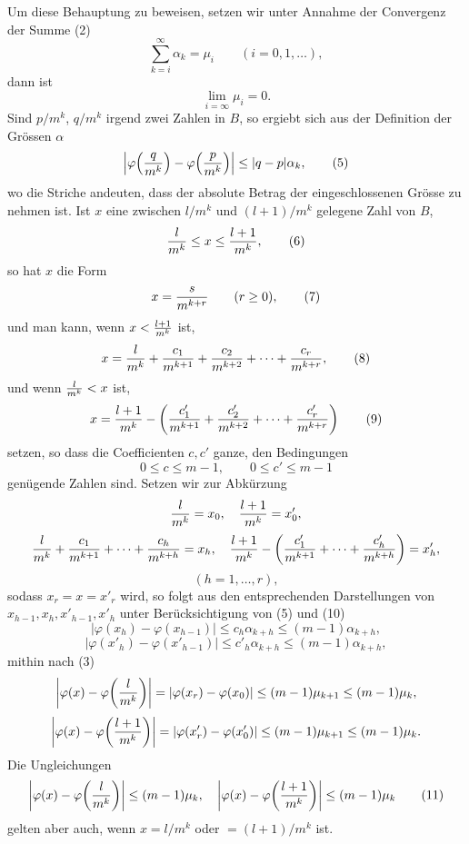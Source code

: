 Um diese Behauptung zu beweisen, setzen wir unter Annahme der Convergenz der Summe (2)
\begin{equation}
 \sum_{k=i}^{\infty}\alpha_k=\mu_i\qquad (i=0,1,\ldots),
\tag{3}
\end{equation}
dann ist
\begin{equation}
 \lim_{i=\infty}\mu_i=0.
\tag{4}
\end{equation}
Sind $p/m^k$, $q/m^k$ irgend zwei Zahlen in $B$, so ergiebt sich aus der Definition der Grössen $\alpha$
\begin{equation}
 \left|\varphi\!\left({q\over m^k}\right)-\varphi\!\left({p\over m^k}\right)\right|\le |q-p|\alpha_k,
\tag{5}
\end{equation}
wo die Striche andeuten, dass der absolute Betrag der eingeschlossenen Grösse zu nehmen ist. Ist $x$ eine zwischen $l/m^k$ und $(l+1)/m^k$ gelegene Zahl von $B$,
\begin{equation}
 {l\over m^k}\le x\le {l+1\over m^k},
\tag{6}
\end{equation}
so hat $x$ die Form
\begin{equation}
 x={s\over m^{k+r}}\qquad (r\ge0),
\tag{7}
\end{equation}
und man kann, wenn $x<{l+1\over m^k}$ ist,
\begin{equation}
 x={l\over m^k}+{c_1\over m^{k+1}}+{c_2\over m^{k+2}}+\cdots+{c_r\over m^{k+r}},
\tag{8}
\end{equation}
und wenn ${l\over m^k}<x$ ist,
\begin{equation}
 x={l+1\over m^k}-\left({c'_1\over m^{k+1}}+{c'_2\over m^{k+2}}+\cdots+{c'_r\over m^{k+r}}\right)
\tag{9}
\end{equation}
setzen, so dass die Coefficienten $c,c'$ ganze, den Bedingungen
\begin{equation}
 0\le c\le m-1,
 \qquad
 0\le c'\le m-1
\tag{10}
\end{equation}
genügende Zahlen sind. Setzen wir zur Abkürzung
\[
 {l\over m^k}=x_0,
 \quad
 {l+1\over m^k}=x'_0,
\]
\[
 {l\over m^k}+{c_1\over m^{k+1}}+\cdots+{c_h\over m^{k+h}}=x_h,
 \quad
 {l+1\over m^k}-\left({c'_1\over m^{k+1}}+\cdots+{c'_h\over m^{k+h}}\right)=x'_h,
\]
\[
 (h=1,\ldots,r),
\]
sodass $x_r=x=x'_r$ wird, so folgt aus den entsprechenden Darstellungen von $x_{h-1},x_h,x'_{h-1},x'_h$ unter Berücksichtigung von (5) und (10)
\[
 \left|\varphi(x_h)-\varphi(x_{h-1})\right|\le c_h\alpha_{k+h}\le(m-1)\alpha_{k+h},
\]
\[
 \left|\varphi(x'_h)-\varphi(x'_{h-1})\right|\le c'_h\alpha_{k+h}\le(m-1)\alpha_{k+h},
\]
mithin nach (3)
\[
 \left|\varphi(x)-\varphi\!\left({l\over m^k}\right)\right|=|\varphi(x_r)-\varphi(x_0)|\le(m-1)\mu_{k+1}\le(m-1)\mu_k,
\]
\[
 \left|\varphi(x)-\varphi\!\left({l+1\over m^k}\right)\right|=|\varphi(x'_r)-\varphi(x'_0)|\le(m-1)\mu_{k+1}\le(m-1)\mu_k.
\]
Die Ungleichungen
\begin{equation}
 \left|\varphi(x)-\varphi\!\left({l\over m^k}\right)\right|\le(m-1)\mu_k,
 \quad
 \left|\varphi(x)-\varphi\!\left({l+1\over m^k}\right)\right|\le(m-1)\mu_k
\tag{11}
\end{equation}
gelten aber auch, wenn $x=l/m^k$ oder $=(l+1)/m^k$ ist.

